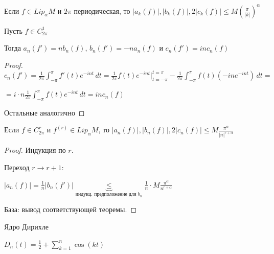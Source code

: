 \begin{consequence}
    Если $f \in Lip_\alpha M$ и $2\pi$ периодическая, то
    $|a_k (f)|, |b_k(f) |, 2| c_k(f) | \leqslant M \left (\frac{\pi}{|k|} \right )^\alpha$
\end{consequence}

\begin{lemma}
    Пусть $f \in C_{2\pi}^1$

    Тогда $a_n (f') = n b_n (f)$, $b_n (f') = -n a_n (f)$ и $c_n (f') = in c_n (f)$
\end{lemma}

\begin{proof}
    $c_n (f') = \frac{1}{2\pi} \int_{-\pi}^\pi f'(t) e^{-int} \, dt = \frac{1}{2\pi} f(t) e^{-int} \bigg |_{t = -\pi}^{t = \pi} - \frac{1}{2\pi} \int_{-\pi}^\pi f (t) (-ine^{-int}) \, dt = $

    $=i \cdot n \frac{1}{2\pi} \int_{-\pi}^\pi f(t) e^{-int} \, dt = in c_n (f)$

    Остальные аналогично
\end{proof}

\begin{consequence}
    Если $f \in C_{2\pi}^r$ и $f^{(r)} \in Lip_{\alpha} M$, то $|a_n(f)|, |b_n (f)|, 2|c_n (f)| \leqslant M \frac{\pi^\alpha}{|n|^{r + \alpha}}$
\end{consequence}

\begin{proof}
    Индукция по $r$.

    Переход $r \to r + 1$:

    $| a_n(f) | = \frac{1}{n} |b_n(f')| \underbrace{\leq}_{\text{индукц. предположение для } b_n} \frac{1}{n} \cdot M \frac{\pi^{\alpha}}{n^{r + \alpha}}$

    База: вывод соответствующей теоремы.
\end{proof}

\begin{definition}
    Ядро Дирихле

    $D_n (t) = \frac{1}{2} + \sum_{k = 1}^n \cos (kt)$
\end{definition}

